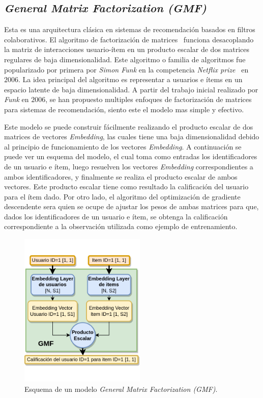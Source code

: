 \documentclass[11pt,a4paper,twoside]{thesis}
\begin{document}
\subsection{\textit{General Matrix Factorization (GMF)}}

Esta es una arquitectura clásica en sistemas de recomendación basados en
filtros colaborativos. El algoritmo de factorización de matrices~\cite{afm}
funciona desacoplando la matriz de interacciones usuario-ítem en un producto
escalar de dos matrices regulares de baja dimensionalidad. Este algoritmo o
familia de algoritmos fue popularizado por primera por \textit{Simon Funk} en
la competencia \textit{Netflix prize}~\cite{netflixprize} en $2006$. La idea
principal del algoritmo es representar a usuarios e ítems en un espacio latente
de baja dimensionalidad. A partir del trabajo inicial realizado por
\textit{Funk} en $2006$, se han propuesto multiples enfoques de factorización
de matrices para sistemas de recomendación, siento este el modelo mas simple y
efectivo.

Este modelo se puede construir fácilmente realizando el producto escalar de dos
matrices de vectores \textit{Embedding}, las cuales tiene una baja
dimensionalidad debido al principio de funcionamiento de los vectores
\textit{Embedding}. A continuación se puede ver un esquema del modelo, el cual
toma como entradas los identificadores de un usuario e ítem, luego resuelven
los vectores \textit{Embedding} correspondientes a ambos identificadores, y
finalmente se realiza el producto escalar de ambos vectores. Este producto
escalar tiene como resultado la calificación del usuario para el ítem dado. Por
otro lado, el algoritmo del optimización de gradiente descendente sera quien se
ocupe de ajustar los pesos de ambas matrices para que, dados los
identificadores de un usuario e ítem, se obtenga la calificación
correspondiente a la observación utilizada como ejemplo de entrenamiento.

\begin{figure}[h!]
	\centering
	\includegraphics[width=6cm]{./images/GMF.png}
	\caption{
		Esquema de un modelo \textit{General Matrix Factorization (GMF)}.
	}
	\label{fig:GMFModel}
\end{figure}
\end{document}
